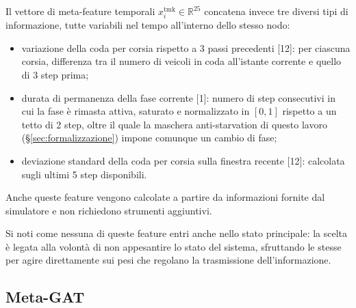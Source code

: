 Il vettore di meta-feature temporali $x^{\mathrm{tmk}}_i \in \mathbb{R}^{25}$
concatena invece tre diversi tipi di informazione, tutte variabili nel tempo all'interno dello stesso nodo:
\begin{itemize}
  \item variazione della coda per corsia rispetto a 3 passi precedenti [12]: per ciascuna corsia, differenza tra il numero di veicoli in coda all'istante corrente e quello di 3 step prima;
  \item durata di permanenza della fase corrente [1]: numero di step consecutivi in cui la fase è rimasta attiva, saturato e normalizzato in $[0,1]$ rispetto a un tetto di 2 step, oltre il quale la maschera anti-starvation di questo lavoro (§\ref{sec:formalizzazione}) impone comunque un cambio di fase;
  \item deviazione standard della coda per corsia sulla finestra recente [12]: calcolata sugli ultimi 5 step disponibili.
\end{itemize}
Anche queste feature vengono calcolate a partire da informazioni fornite dal simulatore e non richiedono strumenti aggiuntivi.

Si noti come nessuna di queste feature entri anche nello stato principale: la scelta
è legata alla volontà di non appesantire lo stato del sistema, sfruttando le stesse
per agire direttamente sui pesi che regolano la trasmissione dell'informazione.

\subsection{Meta-GAT}
\label{subsec:meta-gat}

